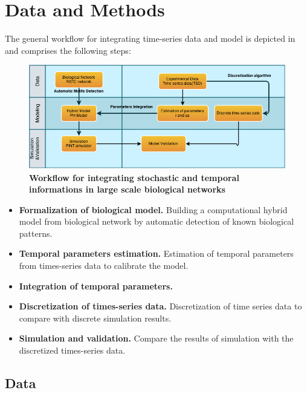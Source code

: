 
\section{Data and Methods}


The general workflow for integrating time-series data and model is depicted in  and comprises the following steps:

\begin{figure}[!t]
 \centering
 \includegraphics[width=6.5in]{images/workflow-2.png}
\caption{{\bf Workflow for integrating stochastic and temporal informations in large scale biological networks}} 
 \label{fig:workflow}
\end{figure}

\begin{itemize}
 \item \textbf{Formalization of biological model.} Building a computational hybrid model  from biological network by automatic detection of known biological patterns.
 \item \textbf{Temporal parameters estimation.} Estimation of temporal parameters from times-series data to calibrate the model.
 \item \textbf{Integration of temporal parameters.} 
 \item \textbf{Discretization of times-series data.} Discretization of time series data to compare with discrete simulation results.
 \item \textbf{Simulation and validation.} Compare the results of simulation with the discretized times-series data.
\end{itemize}

\subsection{Data}

